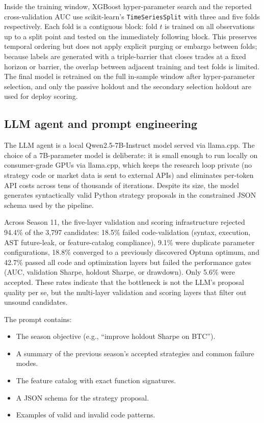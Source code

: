 \documentclass[11pt,a4paper]{article}
\begin{document}
Inside the training window, XGBoost hyper-parameter search and the reported cross-validation AUC use scikit-learn's \texttt{TimeSeriesSplit} with three and five folds respectively. Each fold is a contiguous block: fold \(t\) is trained on all observations up to a split point and tested on the immediately following block. This preserves temporal ordering but does not apply explicit purging or embargo between folds; because labels are generated with a triple-barrier that closes trades at a fixed horizon or barrier, the overlap between adjacent training and test folds is limited. The final model is retrained on the full in-sample window after hyper-parameter selection, and only the passive holdout and the secondary selection holdout are used for deploy scoring.

\subsection{LLM agent and prompt engineering}\label{llm-agent-and-prompt-engineering}

The LLM agent is a local Qwen2.5-7B-Instruct model served via llama.cpp. The choice of a 7B-parameter model is deliberate: it is small enough to run locally on consumer-grade GPUs via llama.cpp, which keeps the research loop private (no strategy code or market data is sent to external APIs) and eliminates per-token API costs across tens of thousands of iterations. Despite its size, the model generates syntactically valid Python strategy proposals in the constrained JSON schema used by the pipeline.

Across Season 11, the five-layer validation and scoring infrastructure rejected 94.4\% of the 3,797 candidates: 18.5\% failed code-validation (syntax, execution, AST future-leak, or feature-catalog compliance), 9.1\% were duplicate parameter configurations, 18.8\% converged to a previously discovered Optuna optimum, and 42.7\% passed all code and optimization layers but failed the performance gates (AUC, validation Sharpe, holdout Sharpe, or drawdown). Only 5.6\% were accepted. These rates indicate that the bottleneck is not the LLM's proposal quality per se, but the multi-layer validation and scoring layers that filter out unsound candidates.

The prompt contains:

\begin{itemize}
\item
  The season objective (e.g., ``improve holdout Sharpe on BTC'').
\item
  A summary of the previous season's accepted strategies and common failure modes.
\item
  The feature catalog with exact function signatures.
\item
  A JSON schema for the strategy proposal.
\item
  Examples of valid and invalid code patterns.
\end{itemize}
\end{document}
